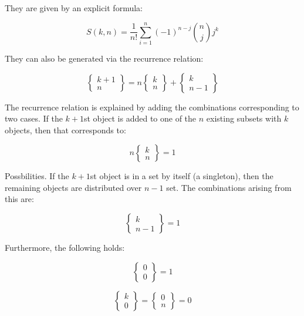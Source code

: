 They are given by an explicit formula:

\begin{equation}
S(k,n) = \frac{1}{n!}\sum_{i=1}^n (-1)^{n-j} {n \choose j}j^k
\end{equation}

They can also be generated via the recurrence relation:

\begin{equation}
\left\{\begin{array}{c}k+1\\n\end{array}\right\} = n\left\{\begin{array}{c}k\\n\end{array}\right\} + \left\{\begin{array}{c}k\\n-1\end{array}\right\}
\end{equation}

The recurrence relation is explained by adding the combinations corresponding to two cases. If the $k+1$st object is added to one of the $n$ existing subsets with $k$ objects, then that corresponds to:

\begin{equation}
n\left\{\begin{array}{c}k\\n\end{array}\right\} = 1
\end{equation}

Possbilities. If the $k+1$st object is in a set by itself (a singleton), then the remaining objects are distributed over $n-1$ set. The combinations arising from this are:

\begin{equation}
\left\{\begin{array}{c}k\\n-1\end{array}\right\} = 1
\end{equation}

Furthermore, the following holds:

\begin{equation}
\left\{\begin{array}{c}0\\0\end{array}\right\} = 1
\end{equation}

\begin{equation}
\left\{\begin{array}{c}k\\0\end{array}\right\} = \left\{\begin{array}{c}0\\n\end{array}\right\} = 0
\end{equation}

